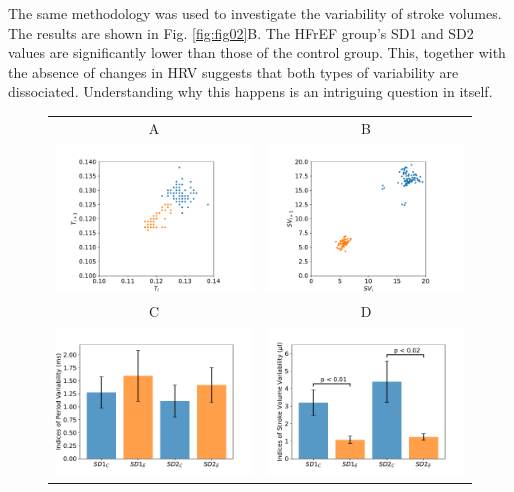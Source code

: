 \documentclass[%
preprint,
 amsmath,amssymb,
 aps,
]{revtex4-2}
\begin{document}
The same methodology was used to investigate the variability of stroke volumes. The results are shown in Fig. \ref{fig:fig02}B. The HFrEF group's SD1 and SD2 values are significantly lower than those of the control group. This, together with the absence of changes in HRV suggests that both types of variability are dissociated. Understanding why this happens is an intriguing question in itself. 

\begin{figure}[h!]
    \begin{tabular}{cc}
        A & B \\
        \includegraphics[width=3in]{Fig02_A.pdf} &
        \includegraphics[width=3in]{Fig02_B.pdf} \\
        C & D \\
        \includegraphics[width=3in]{Fig02_C.pdf} &
        \includegraphics[width=3in]{Fig02_D.pdf}

\end{tabular}
\end{figure}
\end{document}
